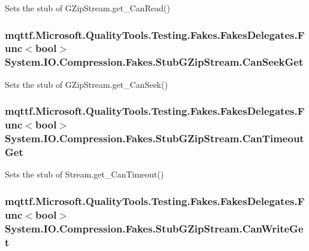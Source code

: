 Sets the stub of G\-Zip\-Stream.\-get\-\_\-\-Can\-Read()

\hypertarget{class_system_1_1_i_o_1_1_compression_1_1_fakes_1_1_stub_g_zip_stream_ae6a7634b38c7b10519f014a7ba3aab15}{
\subsubsection[{Can\-Seek\-Get}]{\setlength{\rightskip}{0pt plus 5cm}mqttf.\-Microsoft.\-Quality\-Tools.\-Testing.\-Fakes.\-Fakes\-Delegates.\-Func$<$bool$>$ System.\-I\-O.\-Compression.\-Fakes.\-Stub\-G\-Zip\-Stream.\-Can\-Seek\-Get}}\label{class_system_1_1_i_o_1_1_compression_1_1_fakes_1_1_stub_g_zip_stream_ae6a7634b38c7b10519f014a7ba3aab15}


Sets the stub of G\-Zip\-Stream.\-get\-\_\-\-Can\-Seek()

\hypertarget{class_system_1_1_i_o_1_1_compression_1_1_fakes_1_1_stub_g_zip_stream_ac7e275cb8520a6c17b3da8e6799a83c4}{
\subsubsection[{Can\-Timeout\-Get}]{\setlength{\rightskip}{0pt plus 5cm}mqttf.\-Microsoft.\-Quality\-Tools.\-Testing.\-Fakes.\-Fakes\-Delegates.\-Func$<$bool$>$ System.\-I\-O.\-Compression.\-Fakes.\-Stub\-G\-Zip\-Stream.\-Can\-Timeout\-Get}}\label{class_system_1_1_i_o_1_1_compression_1_1_fakes_1_1_stub_g_zip_stream_ac7e275cb8520a6c17b3da8e6799a83c4}


Sets the stub of Stream.\-get\-\_\-\-Can\-Timeout()

\hypertarget{class_system_1_1_i_o_1_1_compression_1_1_fakes_1_1_stub_g_zip_stream_ac42920830672fd33a261d3bec8b3e3d9}{
\subsubsection[{Can\-Write\-Get}]{\setlength{\rightskip}{0pt plus 5cm}mqttf.\-Microsoft.\-Quality\-Tools.\-Testing.\-Fakes.\-Fakes\-Delegates.\-Func$<$bool$>$ System.\-I\-O.\-Compression.\-Fakes.\-Stub\-G\-Zip\-Stream.\-Can\-Write\-Get}}\label{class_system_1_1_i_o_1_1_compression_1_1_fakes_1_1_stub_g_zip_stream_ac42920830672fd33a261d3bec8b3e3d9}


